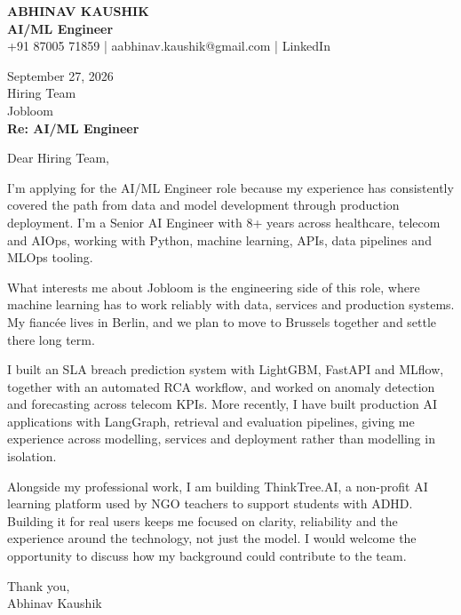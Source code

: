 \documentclass[10pt,a4paper]{article}
\begin{document}
\begin{center}
{\Large\bfseries ABHINAV KAUSHIK}\\[2pt]
{\bfseries AI/ML Engineer}\\[2pt]
+91 87005 71859 \quad | \quad aabhinav.kaushik@gmail.com \quad | \quad LinkedIn
\end{center}
\vspace{8pt}
September 27, 2026\\[6pt]
Hiring Team\\
Jobloom\\[4pt]
\textbf{Re: AI/ML Engineer}

Dear Hiring Team,

I’m applying for the AI/ML Engineer role because my experience has consistently covered the path from data and model development through production deployment. I’m a Senior AI Engineer with 8+ years across healthcare, telecom and AIOps, working with Python, machine learning, APIs, data pipelines and MLOps tooling.

What interests me about Jobloom is the engineering side of this role, where machine learning has to work reliably with data, services and production systems. My fiancée lives in Berlin, and we plan to move to Brussels together and settle there long term.

I built an SLA breach prediction system with LightGBM, FastAPI and MLflow, together with an automated RCA workflow, and worked on anomaly detection and forecasting across telecom KPIs. More recently, I have built production AI applications with LangGraph, retrieval and evaluation pipelines, giving me experience across modelling, services and deployment rather than modelling in isolation.

Alongside my professional work, I am building ThinkTree.AI, a non-profit AI learning platform used by NGO teachers to support students with ADHD. Building it for real users keeps me focused on clarity, reliability and the experience around the technology, not just the model. I would welcome the opportunity to discuss how my background could contribute to the team.

Thank you,\\
Abhinav Kaushik
\end{document}
